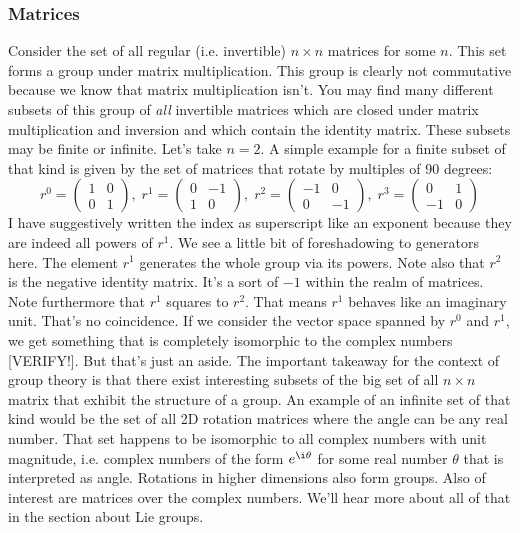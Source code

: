 \subsubsection{Matrices}
Consider the set of all regular (i.e. invertible) $n \times n$ matrices for some $n$. This set forms a group under matrix multiplication. This group is clearly not commutative because we know that matrix multiplication isn't. You may find many different subsets of this group of \emph{all} invertible matrices which are closed under matrix multiplication and inversion and which contain the identity matrix. These subsets may be finite or infinite. Let's take $n=2$. A simple example for a finite subset of that kind is given by the set of matrices that rotate by multiples of 90 degrees:
\begin{equation}
r^0 = \begin{pmatrix}  1 &  0 \\  0  &  1  \end{pmatrix}, \;
r^1 = \begin{pmatrix}  0 & -1 \\  1  &  0  \end{pmatrix}, \;
r^2 = \begin{pmatrix} -1 &  0 \\  0  & -1  \end{pmatrix}, \;
r^3 = \begin{pmatrix}  0 &  1 \\ -1  &  0  \end{pmatrix}
\end{equation}	
I have suggestively written the index as superscript like an exponent because they are indeed all powers of $r^1$. We see a little bit of foreshadowing to generators here. The element $r^1$ generates the whole group via its powers. Note also that $r^2$ is the negative identity matrix. It's a sort of $-1$ within the realm of matrices. Note furthermore that $r^1$ squares to $r^2$. That means $r^1$ behaves like an imaginary unit. That's no coincidence. If we consider the vector space spanned by $r^0$ and $r^1$, we get something that is completely isomorphic to the complex numbers [VERIFY!]. But that's just an aside. The important takeaway for the context of group theory is that there exist interesting subsets of the big set of all $n \times n$ matrix that exhibit the structure of a group. An example of an infinite set of that kind would be the set of all 2D rotation matrices where the angle can be any real number. That set happens to be isomorphic to all complex numbers with unit magnitude, i.e. complex numbers of the form $e^{\i \theta}$ for some real number $\theta$ that is interpreted as angle. Rotations in higher dimensions also form groups. Also of interest are matrices over the complex numbers. We'll hear more about all of that in the section about Lie groups.

